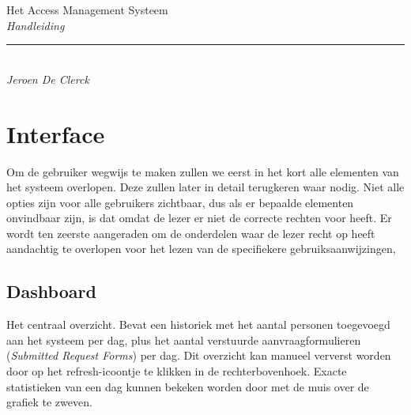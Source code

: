 \documentclass[]{memoir}
\begin{document}
\begingroup%
\centering
\vspace*{0.1\textheight}
{\Huge Het Access Management Systeem}\\[\baselineskip]
{\large\itshape Handleiding}\\[\baselineskip]
\vfill
\rule{0.4\textwidth}{0.4pt}\\[\baselineskip]
{\large\itshape Jeroen De Clerck}\par
\vspace*{0.1\textheight}
\endgroup
\thispagestyle{empty}

\clearpage
{}
\tableofcontents
\clearpage





\chapter{Interface} \label{Interface}
Om de gebruiker wegwijs te maken zullen we eerst in het kort alle elementen van het systeem overlopen. Deze zullen later in detail terugkeren waar nodig. Niet alle opties zijn voor alle gebruikers zichtbaar, dus als er bepaalde elementen onvindbaar zijn, is dat omdat de lezer er niet de correcte rechten voor heeft. Er wordt ten zeerste aangeraden om de onderdelen waar de lezer recht op heeft aandachtig te overlopen voor het lezen van de specifiekere gebruiksaanwijzingen,

\section{Dashboard} \label{Dashboard}
Het centraal overzicht. Bevat een historiek met het aantal personen toegevoegd aan het systeem per dag, plus het aantal verstuurde aanvraagformulieren (\textsl{Submitted Request Forms}) per dag. Dit overzicht kan manueel ververst worden door op het refresh-icoontje te klikken in de rechterbovenhoek. Exacte statistieken van een dag kunnen bekeken worden door met de muis over de grafiek te zweven.
\end{document}
